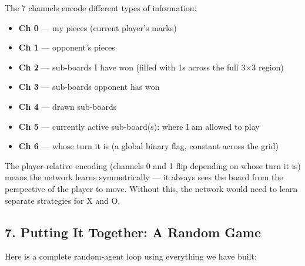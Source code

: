 The 7 channels encode different types of information:

\begin{itemize}
\tightlist
\item
  \textbf{Ch 0} --- my pieces (current player's marks)
\item
  \textbf{Ch 1} --- opponent's pieces
\item
  \textbf{Ch 2} --- sub-boards I have won (filled with 1s across the
  full 3×3 region)
\item
  \textbf{Ch 3} --- sub-boards opponent has won
\item
  \textbf{Ch 4} --- drawn sub-boards
\item
  \textbf{Ch 5} --- currently active sub-board(s): where I am allowed to
  play
\item
  \textbf{Ch 6} --- whose turn it is (a global binary flag, constant
  across the grid)
\end{itemize}

The player-relative encoding (channels 0 and 1 flip depending on whose
turn it is) means the network learns symmetrically --- it always sees
the board from the perspective of the player to move. Without this, the
network would need to learn separate strategies for X and O.

\hypertarget{putting-it-together-a-random-game}{%
\subsection{7. Putting It Together: A Random
Game}\label{putting-it-together-a-random-game}}

Here is a complete random-agent loop using everything we have built:

